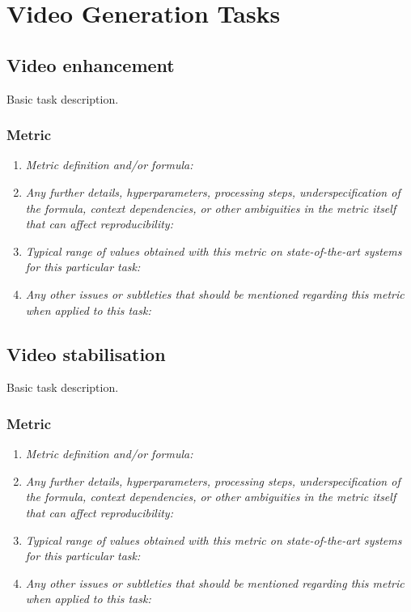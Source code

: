 \documentclass[a4paper,11pt]{article}
\begin{document}
\section{Video Generation Tasks}
\subsection{Video enhancement}
    Basic task description.
    \subsubsection{Metric}
        \begin{enumerate}[label=\alph*.]
            \item \textit{Metric definition and/or formula:}
            \bigskip
            \item \textit{Any further details, hyperparameters, processing steps, underspecification of the formula, context dependencies, or other ambiguities in the metric itself that can affect reproducibility:}
            \bigskip
            \item \textit{Typical range of values obtained with this metric on state-of-the-art systems for this particular task:}
            \bigskip
            \item \textit{Any other issues or subtleties that should be mentioned regarding this metric when applied to this task:}
            \bigskip
        \end{enumerate}

\subsection{Video stabilisation}
    Basic task description.
    \subsubsection{Metric}
        \begin{enumerate}[label=\alph*.]
            \item \textit{Metric definition and/or formula:}
            \bigskip
            \item \textit{Any further details, hyperparameters, processing steps, underspecification of the formula, context dependencies, or other ambiguities in the metric itself that can affect reproducibility:}
            \bigskip
            \item \textit{Typical range of values obtained with this metric on state-of-the-art systems for this particular task:}
            \bigskip
            \item \textit{Any other issues or subtleties that should be mentioned regarding this metric when applied to this task:}
            \bigskip
        \end{enumerate}
\end{document}
